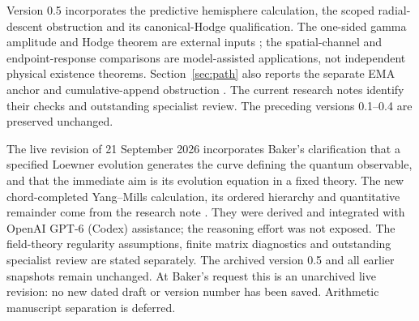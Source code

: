 Version 0.5 incorporates the predictive hemisphere calculation,
the scoped radial-descent obstruction and its canonical-Hodge
qualification. The one-sided gamma amplitude and Hodge theorem are
external inputs \cite{DPYHiggs,DedushenkoGluing}; the spatial-channel
and endpoint-response comparisons are model-assisted applications,
not independent physical existence theorems. Section~\ref{sec:path}
also reports the separate EMA anchor and cumulative-append
obstruction \cite{EMAAnchor,CumulativeAppend}. The current research
notes identify their checks and outstanding specialist review.
The preceding versions 0.1--0.4 are preserved unchanged.


The live revision of 21 September 2026 incorporates Baker's clarification
that a specified Loewner evolution generates the curve defining the quantum
observable, and that the immediate aim is its evolution equation in a fixed
theory. The new chord-completed Yang--Mills calculation, its ordered hierarchy
and quantitative remainder come from the research note \cite{GrowingTraceNote}.
They were derived and integrated with OpenAI GPT-6 (Codex) assistance; the
reasoning effort was not exposed. The field-theory regularity assumptions,
finite matrix diagnostics and outstanding specialist review are stated
separately. The archived version 0.5 and all earlier snapshots remain unchanged.
At Baker's request this is an unarchived live revision: no new dated draft or
version number has been saved. Arithmetic manuscript separation is deferred.

